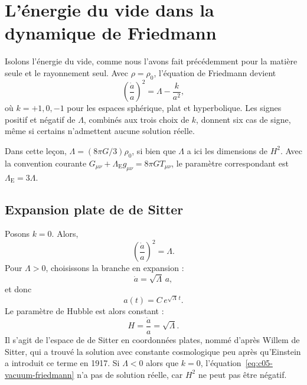 \section{L’énergie du vide dans la dynamique de Friedmann}

Isolons l’énergie du vide, comme nous l’avons fait précédemment pour la matière seule et le rayonnement seul. Avec \(\rho=\rho_0\), l’équation de Friedmann devient
\begin{equation}
\left(\frac{\dot a}{a}\right)^2=\Lambda-\frac{k}{a^2},
\label{eq:c05-vacuum-friedmann}
\end{equation}
où \(k=+1,0,-1\) pour les espaces sphérique, plat et hyperbolique. Les signes positif et négatif de \(\Lambda\), combinés aux trois choix de \(k\), donnent six cas de signe, même si certains n’admettent aucune solution réelle.

\begin{remark}
Dans cette leçon, \(\Lambda=(8\pi G/3)\rho_0\), si bien que \(\Lambda\) a ici les dimensions de \(H^2\). Avec la convention courante \(G_{\mu\nu}+\Lambda_{\mathrm E}g_{\mu\nu}=8\pi G T_{\mu\nu}\), le paramètre correspondant est \(\Lambda_{\mathrm E}=3\Lambda\).
\end{remark}

\subsection{Expansion plate de de Sitter}

Posons \(k=0\). Alors,
\begin{equation}
\left(\frac{\dot a}{a}\right)^2=\Lambda.
\end{equation}
Pour \(\Lambda>0\), choisissons la branche en expansion :
\begin{equation}
\dot a=\sqrt{\Lambda}\,a,
\end{equation}
et donc
\begin{equation}
a(t)=C\,e^{\sqrt{\Lambda}\,t}.
\end{equation}
Le paramètre de Hubble est alors constant :
\begin{equation}
H=\frac{\dot a}{a}=\sqrt{\Lambda}.
\end{equation}
Il s’agit de l’espace de de Sitter en coordonnées plates, nommé d’après Willem de Sitter, qui a trouvé la solution avec constante cosmologique peu après qu’Einstein a introduit ce terme en 1917. Si \(\Lambda<0\) alors que \(k=0\), l’équation~\eqref{eq:c05-vacuum-friedmann} n’a pas de solution réelle, car \(H^2\) ne peut pas être négatif.

